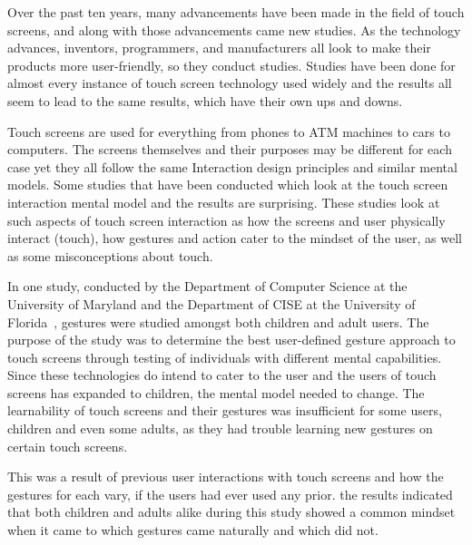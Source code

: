 \documentclass[12pt]{article}
\begin{document}
     Over the past ten years, many advancements have been made in the field of touch screens, and along with those advancements came new studies. As the technology advances, inventors, programmers, and manufacturers all look to make their products more user-friendly, so they conduct studies. Studies have been done for almost every instance of touch screen technology used widely and the results all seem to lead to the same results, which have their own ups and downs.

     Touch screens are used for everything from phones to ATM machines to cars to computers. The screens themselves and their purposes may be different for each case yet they all follow the same Interaction design principles and similar mental models. Some studies that have been conducted which look at the touch screen interaction mental model and the results are surprising. These studies look at such aspects of touch screen interaction as how the screens and user physically interact (touch), how gestures and action cater to the mindset of the user, as well as some misconceptions about touch. 
     
     In one study, conducted by the Department of Computer Science at the University of Maryland and the Department of CISE at the University of Florida~\cite{Gestures}, gestures were studied amongst both children and adult users. The purpose of the study was to determine the best user-defined gesture approach to touch screens through testing of individuals with different mental capabilities. Since these technologies do intend to cater to the user and the users of touch screens has expanded to children, the mental model needed to change. The learnability of touch screens and their gestures was insufficient for some users, children and even some adults, as they had trouble learning new gestures on certain touch screens.

	This was a result of previous user interactions with touch screens and how the gestures for each vary, if the users had ever used any prior. the results indicated that both children and adults alike during this study showed a common mindset when it came to which gestures came naturally and which did not. 
	     
\end{document}
